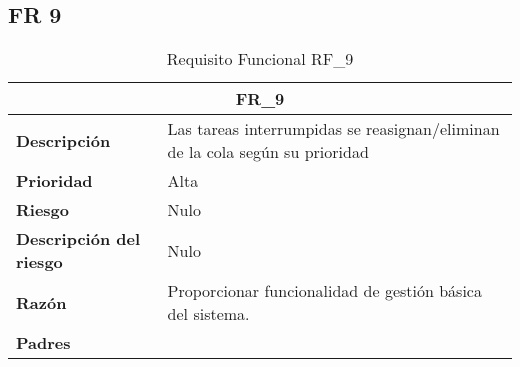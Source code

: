 \documentclass{scrreprt}
\begin{document}
\subsection{FR 9}
    \begin{table}[H]
    
    \label{tab:my-table}
    
    \begin{tabular}{|p{5cm}|p{11cm}|}
    \hline
    \multicolumn{2}{|c|}{\textbf{FR_9}} \\
    \hline
    \textbf{Descripción  }                      & Las tareas interrumpidas se reasignan/eliminan de la cola según su prioridad
                                                                             \\ \hline
    \textbf{Prioridad}                          & Alta                                                                                              \\ \hline
    \textbf{Riesgo}                          & Nulo                                                                                                \\ \hline
    \textbf{Descripción del riesgo}                    & Nulo                                                                               \\ \hline
    \textbf{Razón}                   & Proporcionar funcionalidad de gestión básica del sistema.                                                                                               \\ \hline
    \textbf{Padres}                               &  \\  \hline
    \end{tabular}%
    
    \caption{Requisito Funcional RF_9}
\end{table}
\end{document}
